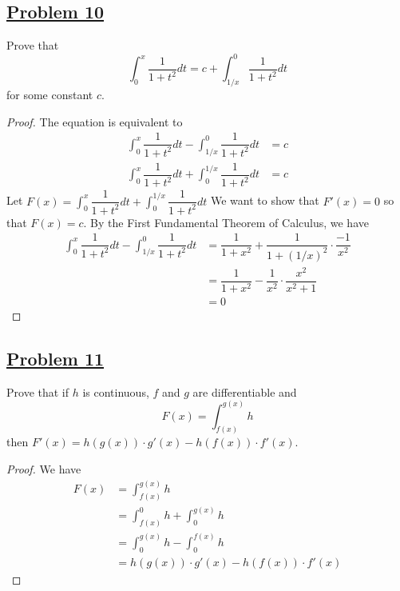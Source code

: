 \documentclass[10pt,letterpaper]{article}
\begin{document}
	\subsection*{{\color{purple}\underline{Problem 10}}}
	Prove that
	$$\displaystyle\int_0^x \dfrac{1}{1 + t^2} dt = c + \displaystyle\int_{1/x}^0 
	\dfrac{1}{1 + t^2} dt$$
	for some constant $c$.
\begin{proof}
	The equation is equivalent to 
\begin{align*}
	\displaystyle\int_0^x \dfrac{1}{1 + t^2} dt - \displaystyle\int_{1/x}^0 
	\dfrac{1}{1 + t^2} dt &= c \\
	 \displaystyle\int_0^x \dfrac{1}{1 + t^2} dt + \displaystyle\int_{0}^{1/x} 
	\dfrac{1}{1 + t^2} dt &= c
\end{align*}
	Let $F(x) =  \displaystyle\int_0^x \dfrac{1}{1 + t^2} dt + \displaystyle\int_{0}^{1/x} 
	\dfrac{1}{1 + t^2} dt$
	We want to show that $F'(x) = 0$ so that $F(x) = c$. By the First Fundamental
	Theorem of Calculus, we have
\begin{align*}
	\int_0^x \dfrac{1}{1 + t^2} dt - \int_{1/x}^0 \dfrac{1}{1 + t^2} dt
	&= \dfrac{1}{1 + x^2} + \dfrac{1}{1 + (1/x)^2} \cdot \dfrac{-1}{x^2} \\
	&= \dfrac{1}{1 + x^2} - \dfrac{1}{x^2} \cdot \dfrac{x^2}{x^2 + 1} \\
	&= 0
\end{align*}
	
	
\end{proof}	
	
	
	\subsection*{{\color{purple}\underline{Problem 11}}}
	Prove that if $h$ is continuous, $f$ and $g$ are differentiable and 
	$$F(x) = \displaystyle\int_{f(x)}^{g(x)} h$$
	then 
	$F'(x) = h(g(x)) \cdot g'(x) - h(f(x)) \cdot f'(x)$.
	\begin{proof}
	We have
\begin{align*}
	F(x) &= \displaystyle\int_{f(x)}^{g(x)} h \\
	&= \displaystyle\int_{f(x)}^{0}h + \displaystyle\int_{0}^{g(x)}h \\
	&= \displaystyle\int_{0}^{g(x)}h - \displaystyle\int_{0}^{f(x)}h \\
	&= h(g(x)) \cdot g'(x) - h(f(x)) \cdot f'(x)
\end{align*}	
	\end{proof}
	
\end{document}
